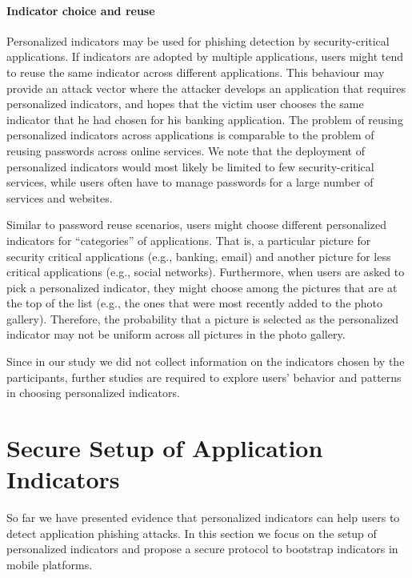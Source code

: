\paragraph{Indicator choice and reuse}
Personalized indicators may be used for phishing detection by security-critical applications. 
If indicators are adopted by multiple applications, users might tend to reuse the same indicator across different applications. 
This behaviour may provide an attack vector where the attacker develops an application that requires personalized indicators, and hopes that the victim user chooses the same indicator  that he had chosen for his banking application. 
The problem of reusing personalized indicators across applications is comparable to the problem of reusing passwords across online services.
We note that the deployment of personalized indicators would most likely be limited to few security-critical services, while users often have to manage passwords for a large number of services and websites.

Similar to password reuse scenarios, users might choose different personalized indicators for ``categories'' of applications. 
That is, a particular picture for security critical applications (e.g., banking, email) and another picture for less critical applications (e.g., social networks).
Furthermore, when users are asked to pick a personalized indicator, they might choose among the pictures that are at the top of the list (e.g., the ones that were most recently added to the photo gallery). 
Therefore, the probability that a picture is selected as the personalized indicator may not be uniform across all pictures in the photo gallery.

Since in our study we did not collect information on the indicators chosen by the participants, further studies are required to explore users' behavior and patterns in choosing personalized indicators.


\section{Secure Setup of Application Indicators}
\label{sec:sp_phishing_setup}

So far we have presented evidence that personalized indicators can help users to detect application phishing attacks.
In this section we focus on the setup of personalized indicators and propose a secure protocol to bootstrap indicators in mobile platforms.

